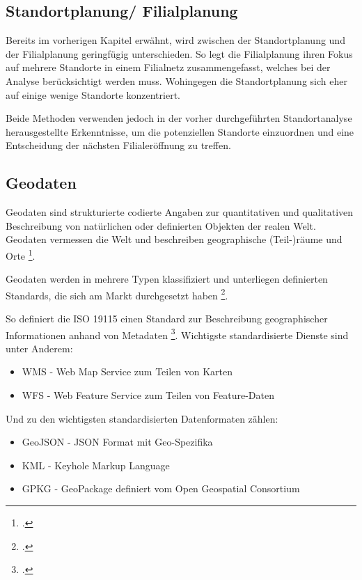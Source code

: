 \subsection{Standortplanung/ Filialplanung}
Bereits im vorherigen Kapitel erwähnt, wird zwischen der Standortplanung und der Filialplanung geringfügig unterschieden.
So legt die Filialplanung ihren Fokus auf mehrere Standorte in einem Filialnetz zusammengefasst, welches bei der Analyse berücksichtigt werden muss.
Wohingegen die Standortplanung sich eher auf einige wenige Standorte konzentriert.

Beide Methoden verwenden jedoch in der vorher durchgeführten Standortanalyse herausgestellte Erkenntnisse, um die potenziellen Standorte einzuordnen und eine Entscheidung der nächsten Filialeröffnung zu treffen.

\subsection{Geodaten}
Geodaten sind strukturierte codierte Angaben zur quantitativen und qualitativen Beschreibung von natürlichen oder definierten Objekten der realen Welt. 
Geodaten vermessen die Welt und beschreiben geographische (Teil-)räume und Orte \footcite{geomarketing_geodaten}.

Geodaten werden in mehrere Typen klassifiziert und unterliegen definierten Standards, die sich am Markt durchgesetzt haben \footcite{gistandards.eu}.

So definiert die ISO 19115 einen Standard zur Beschreibung geographischer Informationen anhand von Metadaten \footcite{19115_iso}.
Wichtigste standardisierte Dienste sind unter Anderem:

\begin{itemize}
	\item WMS - Web Map Service zum Teilen von Karten
	\item WFS - Web Feature Service zum Teilen von Feature-Daten
\end{itemize}

Und zu den wichtigsten standardisierten Datenformaten zählen:

\begin{itemize}
	\item GeoJSON - JSON Format mit Geo-Spezifika
	\item KML - Keyhole Markup Language 
	\item GPKG - GeoPackage definiert vom Open Geospatial Consortium
\end{itemize}

